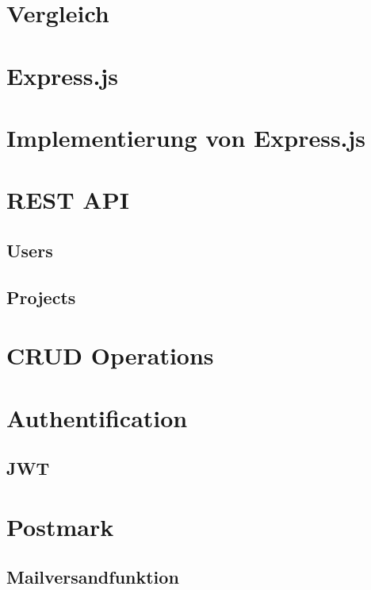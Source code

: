 \section{Vergleich}
\lipsum[1-2]

\section{Express.js}
\lipsum[1-2]

\section{Implementierung von Express.js}
\lipsum[1-2]

\section{REST API}
\lipsum[1-2]

\subsection{Users}
\lipsum[1-2]

\subsection{Projects}
\lipsum[1-2]

\section{CRUD Operations}
\lipsum[1-2]

\section{Authentification}
\lipsum[1-2]

\subsection{JWT}
\lipsum[1-2]

\section{Postmark}
\lipsum[1-2]

\subsection{Mailversandfunktion}
\lipsum[1-2]
